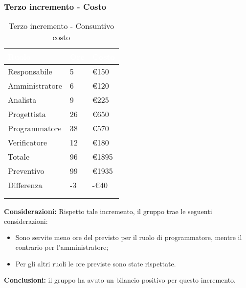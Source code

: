 {    \subsubsection{Terzo incremento - Costo}
    {
      \setlength{\freewidth}{\dimexpr\textwidth-30\tabcolsep}
      \renewcommand{\arraystretch}{1.0}
      \centering
      \setlength{\aboverulesep}{0pt}
      \setlength{\belowrulesep}{0pt}
      \begin{longtable}{C{.4\freewidth} C{.2\freewidth} C{.2\freewidth}}
      \toprule
      \textcolor{white}{\textbf{Ruolo}}&
      \textcolor{white}{\textbf{Ore}}&
      \textcolor{white}{\textbf{Costo}}\\
      \toprule
      \endhead

      Responsabile & 5 & \euro150 \\
      Amministratore & 6 & \euro120 \\
      Analista & 9 & \euro225 \\
      Progettista & 26 & \euro650 \\
      Programmatore & 38 & \euro570 \\
      Verificatore & 12 & \euro180 \\
      Totale & 96 & \euro1895 \\
      Preventivo & 99 & \euro1935 \\
      Differenza & -3 & -\euro40  \\
      \bottomrule
      \\
      \caption{Terzo incremento - Consuntivo costo}

      \end{longtable} 
      
      \textbf{Considerazioni:} 
        Rispetto tale incremento, il gruppo trae le seguenti considerazioni:
        \begin{itemize}
            \item Sono servite meno ore del previsto per il ruolo di programmatore, mentre il contrario per l'amministratore;
            \item Per gli altri ruoli le ore previste sono state rispettate.
        \end{itemize}

        \textbf{Conclusioni:} il gruppo ha avuto un bilancio positivo per questo incremento. 
    }

    \newpage    
}
